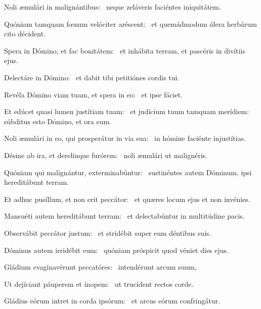 \item Noli æmulári in malignántibus:~\psstar{} neque zeláveris faciéntes iniquitátem.

\item Quóniam tamquam fœnum velóciter aréscent:~\psstar{} et quemádmodum ólera herbárum cito décident.

\item Spera in Dómino, et fac bonitátem:~\psstar{} et inhábita terram, et pascéris in divítiis ejus.

\item Delectáre in Dómino:~\psstar{} et dabit tibi petitiónes cordis tui.

\item Revéla Dómino viam tuam, et spera in eo:~\psstar{} et ipse fáciet.

\item Et edúcet quasi lumen justítiam tuam:~\pscross{} et judícium tuum tamquam merídiem:~\psstar{} súbditus esto Dómino, et ora eum.

\item Noli æmulári in eo, qui prosperátur in via sua:~\psstar{} in hómine faciénte injustítias.

\item Désine ab ira, et derelínque furórem:~\psstar{} noli æmulári ut malignéris.

\item Quóniam qui malignántur, exterminabúntur:~\psstar{} sustinéntes autem Dóminum, ipsi hereditábunt terram.

\item Et adhuc pusíllum, et non erit peccátor:~\psstar{} et quæres locum ejus et non invénies.

\item Mansuéti autem hereditábunt terram:~\psstar{} et delectabúntur in multitúdine pacis.

\item Observábit peccátor justum:~\psstar{} et stridébit super eum déntibus suis.

\item Dóminus autem irridébit eum:~\psstar{} quóniam próspicit quod véniet dies ejus.

\item Gládium evaginavérunt peccatóres:~\psstar{} intendérunt arcum suum,

\item Ut dejíciant páuperem et ínopem:~\psstar{} ut trucídent rectos corde.

\item Gládius eórum intret in corda ipsórum:~\psstar{} et arcus eórum confringátur.


